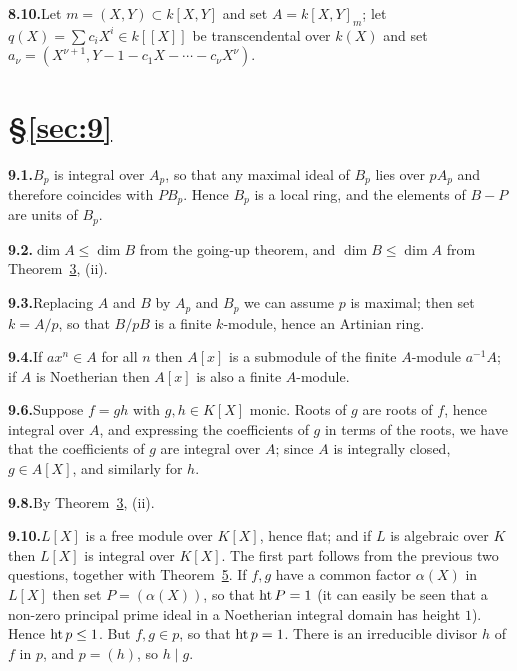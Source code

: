\noindent\textbf{8.10.}\quad Let $m = (X, Y) \subset k[X, Y]$ and set $A = k[X, Y]_m$; let $q(X) = \sum c_iX^i \in k[[X]]$ be
transcendental over $k(X)$ and set $a_\nu = (X^{\nu+1}, Y - 1 - c_1X - \cdots - c_\nu X^\nu)$.

\section*{\S\ref{sec:9}}

\noindent\textbf{9.1.}\quad $B_p$ is integral over $A_p$, so that any maximal ideal of $B_p$ lies over $pA_p$ and
therefore coincides with $PB_p$. Hence $B_p$ is a local ring, and the elements of $B - P$
are units of $B_p$.

\noindent\textbf{9.2.}\quad $\dim A \le \dim B$ from the going-up theorem, and $\dim B \le \dim A$ from Theorem~\hyperref[thm:9.3]{3}, (ii).

\noindent\textbf{9.3.}\quad Replacing $A$ and $B$ by $A_p$ and $B_p$ we can assume $p$ is maximal; then set
$k = A/p$, so that $B/pB$ is a finite $k$-module, hence an Artinian ring.

\noindent\textbf{9.4.}\quad If $ax^n \in A$ for all $n$ then $A[x]$ is a submodule of the finite $A$-module $a^{-1}A$; if
$A$ is Noetherian then $A[x]$ is also a finite $A$-module.

\noindent\textbf{9.6.}\quad Suppose $f = gh$ with $g, h \in K[X]$ monic. Roots of $g$ are roots of $f$, hence
integral over $A$, and expressing the coefficients of $g$ in terms of the roots, we
have that the coefficients of $g$ are integral over $A$; since $A$ is integrally closed,
$g \in A[X]$, and similarly for $h$.

\noindent\textbf{9.8.}\quad By Theorem~\hyperref[thm:9.3]{3}, (ii).

\noindent\textbf{9.10.}\quad $L[X]$ is a free module over $K[X]$, hence flat; and if $L$ is algebraic over $K$
then $L[X]$ is integral over $K[X]$. The first part follows from the previous
two questions, together with Theorem~\hyperref[thm:9.5]{5}. If $f, g$ have a common factor $\alpha(X)$
in $L[X]$ then set $P = (\alpha(X))$, so that $\operatorname{ht} P = 1$ (it can easily be seen that a
non-zero principal prime ideal in a Noetherian integral domain has height
$1$). Hence $\operatorname{ht} p \le 1$. But $f, g \in p$, so that $\operatorname{ht} p = 1$. There is an irreducible
divisor $h$ of $f$ in $p$, and $p = (h)$, so $h \mid g$.
